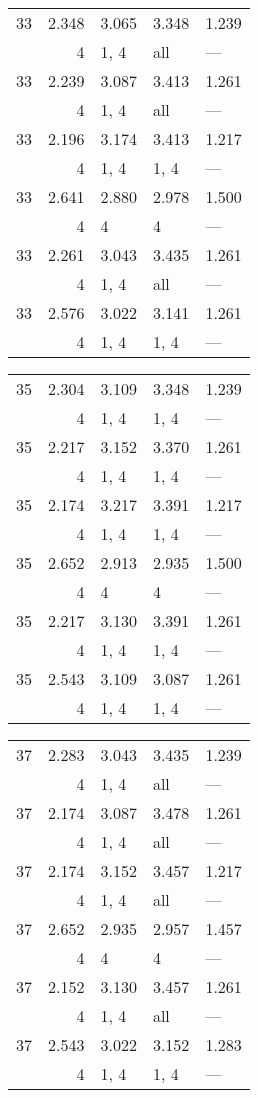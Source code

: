 \begin{tabular}{lrlll}
\toprule
 33 & 2.348 & 3.065 & 3.348 & 1.239 \\
    & 4     & 1, 4  & all   & ---   \\
 33 & 2.239 & 3.087 & 3.413 & 1.261 \\
    & 4     & 1, 4  & all   & ---   \\
 33 & 2.196 & 3.174 & 3.413 & 1.217 \\
    & 4     & 1, 4  & 1, 4  & ---   \\
 33 & 2.641 & 2.880 & 2.978 & 1.500 \\
    & 4     & 4     & 4     & ---   \\
 33 & 2.261 & 3.043 & 3.435 & 1.261 \\
    & 4     & 1, 4  & all   & ---   \\
 33 & 2.576 & 3.022 & 3.141 & 1.261 \\
    & 4     & 1, 4  & 1, 4  & ---   \\
\bottomrule
\end{tabular}
\begin{tabular}{lrlll}
\toprule
 35 & 2.304 & 3.109 & 3.348 & 1.239 \\
    & 4     & 1, 4  & 1, 4  & ---   \\
 35 & 2.217 & 3.152 & 3.370 & 1.261 \\
    & 4     & 1, 4  & 1, 4  & ---   \\
 35 & 2.174 & 3.217 & 3.391 & 1.217 \\
    & 4     & 1, 4  & 1, 4  & ---   \\
 35 & 2.652 & 2.913 & 2.935 & 1.500 \\
    & 4     & 4     & 4     & ---   \\
 35 & 2.217 & 3.130 & 3.391 & 1.261 \\
    & 4     & 1, 4  & 1, 4  & ---   \\
 35 & 2.543 & 3.109 & 3.087 & 1.261 \\
    & 4     & 1, 4  & 1, 4  & ---   \\
\bottomrule
\end{tabular}
\begin{tabular}{lrlll}
\toprule
 37 & 2.283 & 3.043 & 3.435 & 1.239 \\
    & 4     & 1, 4  & all   & ---   \\
 37 & 2.174 & 3.087 & 3.478 & 1.261 \\
    & 4     & 1, 4  & all   & ---   \\
 37 & 2.174 & 3.152 & 3.457 & 1.217 \\
    & 4     & 1, 4  & all   & ---   \\
 37 & 2.652 & 2.935 & 2.957 & 1.457 \\
    & 4     & 4     & 4     & ---   \\
 37 & 2.152 & 3.130 & 3.457 & 1.261 \\
    & 4     & 1, 4  & all   & ---   \\
 37 & 2.543 & 3.022 & 3.152 & 1.283 \\
    & 4     & 1, 4  & 1, 4  & ---   \\
\bottomrule
\end{tabular}
